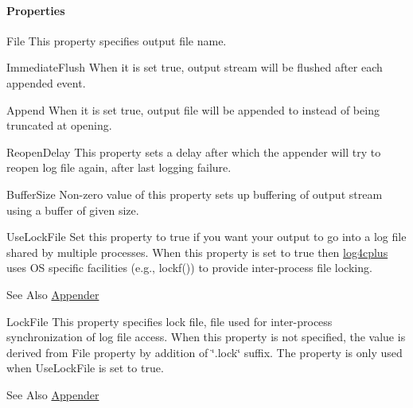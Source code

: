 \paragraph*{Properties}


\begin{DoxyDescription}
\item[{\ttfamily File} ]This property specifies output file name.


\item[{\ttfamily Immediate\-Flush} ]When it is set true, output stream will be flushed after each appended event.


\item[{\ttfamily Append} ]When it is set true, output file will be appended to instead of being truncated at opening.


\item[{\ttfamily Reopen\-Delay} ]This property sets a delay after which the appender will try to reopen log file again, after last logging failure. 


\item[{\ttfamily Buffer\-Size} ]Non-\/zero value of this property sets up buffering of output stream using a buffer of given size. 


\item[{\ttfamily Use\-Lock\-File} ]Set this property to {\ttfamily true} if you want your output to go into a log file shared by multiple processes. When this property is set to true then \hyperlink{namespacelog4cplus}{log4cplus} uses O\-S specific facilities (e.\-g., {\ttfamily lockf()}) to provide inter-\/process file locking. \begin{DoxySeeAlso}{See Also}
\hyperlink{classlog4cplus_1_1Appender}{Appender} 
\end{DoxySeeAlso}

\item[{\ttfamily Lock\-File} ]This property specifies lock file, file used for inter-\/process synchronization of log file access. When this property is not specified, the value is derived from {\ttfamily File} property by addition of \char`\"{}.\-lock\char`\"{} suffix. The property is only used when {\ttfamily Use\-Lock\-File} is set to true. \begin{DoxySeeAlso}{See Also}
\hyperlink{classlog4cplus_1_1Appender}{Appender} 
\end{DoxySeeAlso}


\end{DoxyDescription}
